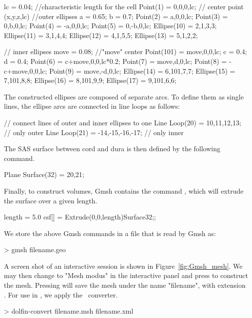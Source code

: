 \begin{anycode}
lc = 0.04;  //characteristic length for the cell
Point(1) = {0,0,0,lc};	// center point (x,y,z,lc)
//outer ellipses
a = 0.65;
b = 0.7;
Point(2) = {a,0,0,lc};
Point(3) = {0,b,0,lc};
Point(4) = {-a,0,0,lc};
Point(5) = {0,-b,0,lc};
Ellipse(10) = {2,1,3,3};
Ellipse(11) = {3,1,4,4};
Ellipse(12) = {4,1,5,5};
Ellipse(13) = {5,1,2,2};

// inner ellipses
move = 0.08; //"move" center
Point(101) = {move,0,0,lc};
c = 0.4;
d = 0.4;
Point(6) = {c+move,0,0,lc*0.2};
Point(7) = {move,d,0,lc};
Point(8) = {-c+move,0,0,lc};
Point(9) = {move,-d,0,lc};
Ellipse(14) = {6,101,7,7};
Ellipse(15) = {7,101,8,8};
Ellipse(16) = {8,101,9,9};
Ellipse(17) = {9,101,6,6};
\end{anycode}

The constructed ellipses are composed of separate arcs. To define them
as single lines, the ellipse arcs are connected in line loops as
follows:

\begin{anycode}
// connect lines of outer and inner ellipses to one
Line Loop(20) = {10,11,12,13};		// only outer
Line Loop(21) = {-14,-15,-16,-17};	// only inner
\end{anycode}
The SAS surface between cord and dura is then defined by the following command.
\begin{anycode}
Plane Surface(32) = {20,21};
\end{anycode}

Finally, to construct volumes, Gmsh contains the command , which will extrude the surface over a given length.
\begin{anycode}
length = 5.0
csf[] = Extrude(0,0,length){Surface{32};};
\end{anycode}

We store the above Gmsh commands in a  file that is read by Gmsh as:
\begin{bash}
> gmsh filename.geo
\end{bash}
A screen shot of an interactive session is shown in
Figure~\ref{fig:Gmsh_mesh}.  We may then change to "Mesh modus" in the
interactive panel and press  to construct the
mesh. Pressing  will save the mesh under the name
"filename", with extension . For use in \dolfin, we apply
the \dolfin\ converter.

\begin{bash}
> dolfin-convert filename.msh filename.xml
\end{bash}

